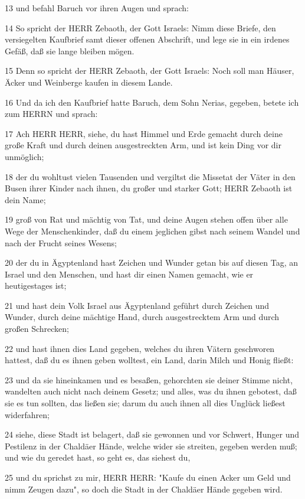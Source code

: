 \par 13 und befahl Baruch vor ihren Augen und sprach:
\par 14 So spricht der HERR Zebaoth, der Gott Israels: Nimm diese Briefe, den versiegelten Kaufbrief samt dieser offenen Abschrift, und lege sie in ein irdenes Gefäß, daß sie lange bleiben mögen.
\par 15 Denn so spricht der HERR Zebaoth, der Gott Israels: Noch soll man Häuser, Äcker und Weinberge kaufen in diesem Lande.
\par 16 Und da ich den Kaufbrief hatte Baruch, dem Sohn Nerias, gegeben, betete ich zum HERRN und sprach:
\par 17 Ach HERR HERR, siehe, du hast Himmel und Erde gemacht durch deine große Kraft und durch deinen ausgestreckten Arm, und ist kein Ding vor dir unmöglich;
\par 18 der du wohltust vielen Tausenden und vergiltst die Missetat der Väter in den Busen ihrer Kinder nach ihnen, du großer und starker Gott; HERR Zebaoth ist dein Name;
\par 19 groß von Rat und mächtig von Tat, und deine Augen stehen offen über alle Wege der Menschenkinder, daß du einem jeglichen gibst nach seinem Wandel und nach der Frucht seines Wesens;
\par 20 der du in Ägyptenland hast Zeichen und Wunder getan bis auf diesen Tag, an Israel und den Menschen, und hast dir einen Namen gemacht, wie er heutigestages ist;
\par 21 und hast dein Volk Israel aus Ägyptenland geführt durch Zeichen und Wunder, durch deine mächtige Hand, durch ausgestrecktem Arm und durch großen Schrecken;
\par 22 und hast ihnen dies Land gegeben, welches du ihren Vätern geschworen hattest, daß du es ihnen geben wolltest, ein Land, darin Milch und Honig fließt:
\par 23 und da sie hineinkamen und es besaßen, gehorchten sie deiner Stimme nicht, wandelten auch nicht nach deinem Gesetz; und alles, was du ihnen gebotest, daß sie es tun sollten, das ließen sie; darum du auch ihnen all dies Unglück ließest widerfahren;
\par 24 siehe, diese Stadt ist belagert, daß sie gewonnen und vor Schwert, Hunger und Pestilenz in der Chaldäer Hände, welche wider sie streiten, gegeben werden muß; und wie du geredet hast, so geht es, das siehest du,
\par 25 und du sprichst zu mir, HERR HERR: "Kaufe du einen Acker um Geld und nimm Zeugen dazu", so doch die Stadt in der Chaldäer Hände gegeben wird.
